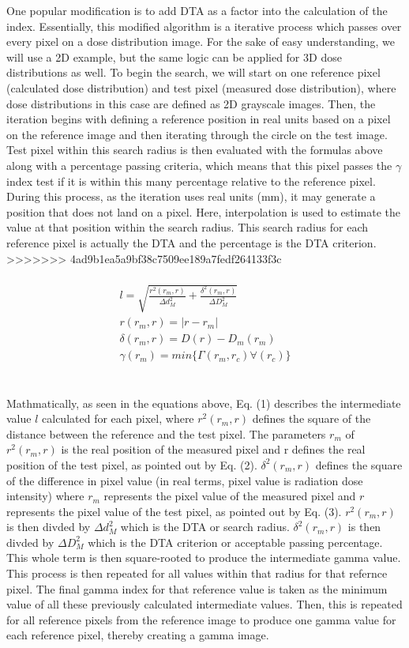 \documentclass[12pt]{article}
\begin{document}
One popular modification is to add DTA as a factor into the calculation of the index. Essentially, this modified algorithm is a iterative process which passes over every pixel on a dose distribution image. For the sake of easy understanding, we will use a 2D example, but the same logic can be applied for 3D dose distributions as well. To begin the search, we will start on one reference pixel (calculated dose distribution) and test pixel (measured dose distribution), where dose distributions in this case are defined as 2D grayscale images. Then, the iteration begins with defining a reference position in real units based on a pixel on the reference image and then iterating through the circle on the test image. Test pixel within this search radius is then evaluated with the formulas above along with a percentage passing criteria, which means that this pixel passes the $\gamma$ index test if it is within this many percentage relative to the reference pixel. During this process, as the iteration uses real units (mm), it may generate a position that does not land on a pixel. Here, interpolation is used to estimate the value at that position within the search radius. This search radius for each reference pixel is actually the DTA and the percentage is the DTA criterion.
>>>>>>> 4ad9b1ea5a9bf38c7509ee189a7fedf264133f3c
\\
\\
\begin{align}
  l = \sqrt{\frac{r^{2}(r_{m}, r)}{\Delta d^{2}_{M}} + \frac{\delta^{2}(r_{m}, r)}{\Delta D^{2}_{M}}} \\
  r(r_{m}, r) = \lvert r-r_{m} \lvert \\
  \delta(r_{m}, r) = D(r)-D_{m}(r_{m}) \\
  \gamma(r_{m}) = min\{\Gamma(r_{m}, r_{c})\forall(r_{c})\}
\end{align}
\\
\\
Mathmatically, as seen in the equations above, Eq. (1) describes the intermediate value $l$ calculated for each pixel, where $r^{2}(r_{m}, r)$ defines the square of the distance between the reference and the test pixel. The parameters $r_{m}$ of $r^{2}(r_{m}, r)$ is the real position of the measured pixel and r defines the real position of the test pixel, as pointed out by Eq. (2). $\delta^{2}(r_{m}, r)$ defines the square of the difference in pixel value (in real terms, pixel value is radiation dose intensity) where $r_{m}$ represents the pixel value of the measured pixel and $r$ represents the pixel value of the test pixel, as pointed out by Eq. (3). $r^{2}(r_{m}, r)$ is then divded by $\Delta d^{2}_{M}$ which is the DTA or search radius. $\delta^{2}(r_{m}, r)$ is then divded by $\Delta D^{2}_{M}$ which is the DTA criterion or acceptable passing percentage. This whole term is then square-rooted to produce the intermediate gamma value. This process is then repeated for all values within that radius for that refernce pixel. The final gamma index for that reference value is taken as the minimum value of all these previously calculated intermediate values. Then, this is repeated for all reference pixels from the reference image to produce one gamma value for each reference pixel, thereby creating a gamma image.
\end{document}
